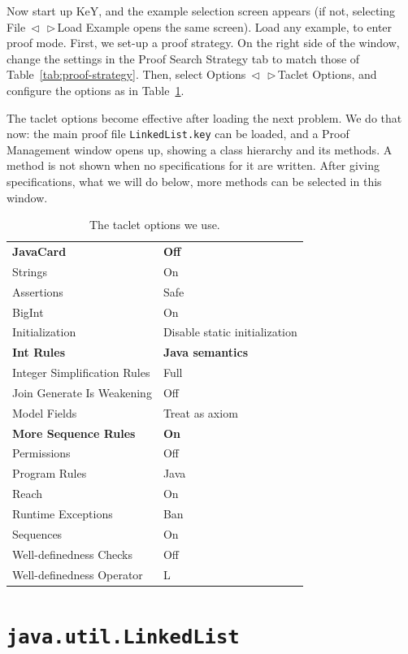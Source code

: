 \documentclass[runningheads]{llncs}
\makeatletter
\DeclareRobustCommand*{\lyxarrow}{%
\@ifstar
{\leavevmode\,$\triangleleft$\,\allowbreak}
{\leavevmode\,$\triangleright$\,\allowbreak}}
\makeatother
\begin{document}
Now start up KeY, and the example selection screen appears (if not, selecting File\lyxarrow Load Example opens the same screen). Load any example, to enter proof mode. 
First, we set-up a proof strategy. On the right side of the window, change the settings in the Proof Search Strategy tab to match those of Table~\ref{tab:proof-strategy}. Then, select Options\lyxarrow Taclet Options, and configure the options as in Table~\ref{tab:taclet-options}.

The taclet options become effective after loading the next problem. We do that now: the main proof file \texttt{LinkedList.key} can be loaded, and a Proof Management window opens up, showing a class hierarchy and its methods. A method is not shown when no specifications for it are written. After giving specifications, what we will do below, more methods can be selected in this window.

\begin{table}
    \begin{tabular}{l@{\hskip6pt}|@{\hskip6pt}l}
    \textbf{JavaCard} & \textbf{Off} \\
    Strings & On \\
    Assertions & Safe \\
    BigInt & On \\
    Initialization & Disable static initialization \\
    \textbf{Int Rules} & \textbf{Java semantics} \\
    Integer Simplification Rules & Full \\
    Join Generate Is Weakening & Off \\
    Model Fields & Treat as axiom \\
    \textbf{More Sequence Rules} & \textbf{On} \\
    Permissions & Off \\
    Program Rules & Java \\
    Reach & On \\
    Runtime Exceptions & Ban \\
    Sequences & On \\
    Well-definedness Checks & Off \\
    Well-definedness Operator & L
    \end{tabular}
    \medskip
    \caption{The taclet options we use.}
    \vspace*{-20pt}
    \label{tab:taclet-options}
\end{table}

\section{\texttt{java.util.LinkedList}}\label{sec:linkedlist}
\end{document}
